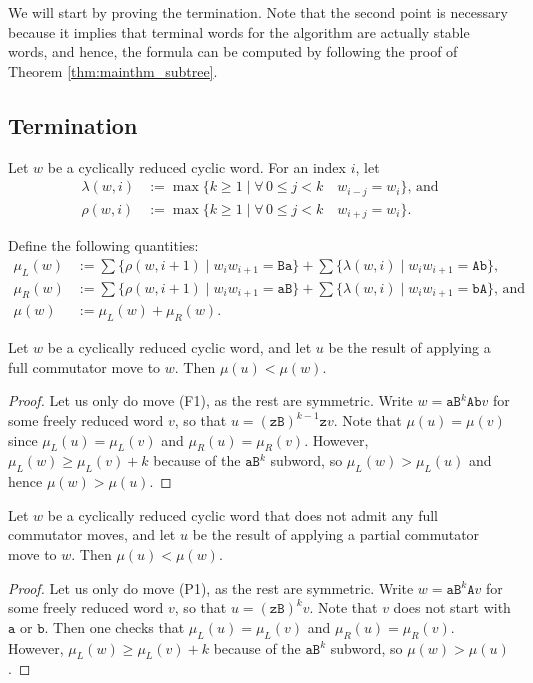 \documentclass{article}
\begin{document}
	We will start by proving the termination. Note that the second point is necessary because it implies that terminal words for the algorithm are actually stable words, and hence, the formula can be computed by following the proof of Theorem \ref{thm:mainthm_subtree}.
	
	\subsection{Termination}
	
	Let $w$ be a cyclically reduced cyclic word.
	For an index $i$, let
	\begin{align*}
		\lambda(w,i)&:=\max\{k\ge 1\mid \forall\, 0\le j<k\quad w_{i-j}=w_i\}\text{, and}\\
		\rho(w,i)&:=\max\{k\ge 1\mid \forall\, 0\le j<k\quad w_{i+j}=w_i\}.
	\end{align*}
	
	Define the following quantities:
	\begin{align*}
		\mu_L(w)&:=\sum\{\rho(w,i+1)\mid w_iw_{i+1}=\mathtt{B a}\}+\sum\{\lambda(w,i)\mid w_iw_{i+1}=\mathtt{A b}\},\\
		\mu_R(w)&:=\sum\{\rho(w,i+1)\mid w_iw_{i+1}=\mathtt{aB}\}+\sum\{\lambda(w,i)\mid w_iw_{i+1}=\mathtt{bA}\}\text{, and}\\
		\mu(w)&:=\mu_L(w)+\mu_R(w).
	\end{align*}
	
	
	\begin{lemma}
		Let $w$ be a cyclically reduced cyclic word, and let $u$ be the result of applying a full commutator move to $w$.
		Then $\mu(u)<\mu(w)$.
	\end{lemma}
	\begin{proof}
		Let us only do move (F1), as the rest are symmetric.
		Write $w=\mathtt{aB}^k\mathtt{Ab}v$ for some freely reduced word $v$, so that $u=(\mathtt{zB})^{k-1}\mathtt{z}v$.
		Note that $\mu(u)=\mu(v)$ since $\mu_L(u)=\mu_L(v)$ and $\mu_R(u)=\mu_R(v)$.
		However, $\mu_L(w)\ge\mu_L(v)+k$ because of the $\mathtt{aB}^k$ subword, so $\mu_L(w)>\mu_L(u)$ and hence $\mu(w)>\mu(u)$.
	\end{proof}
	
	\begin{lemma}
		Let $w$ be a cyclically reduced cyclic word that does not admit any full commutator moves, and let $u$ be the result of applying a partial commutator move to $w$.
		Then $\mu(u)<\mu(w)$.
	\end{lemma}
	\begin{proof}
		Let us only do move (P1), as the rest are symmetric.
		Write $w=\mathtt{aB}^k\mathtt{A} v$ for some freely reduced word $v$, so that $u=(\mathtt{zB})^k v$.
		Note that $v$ does not start with $\mathtt{a}$ or $\mathtt{b}$.
		Then one checks that $\mu_L(u)=\mu_L(v)$ and $\mu_R(u)=\mu_R(v)$.
		However, $\mu_L(w)\ge\mu_L(v)+k$ because of the $\mathtt{aB}^k$ subword, so $\mu(w)>\mu(u)$.
	\end{proof}
	
\end{document}
